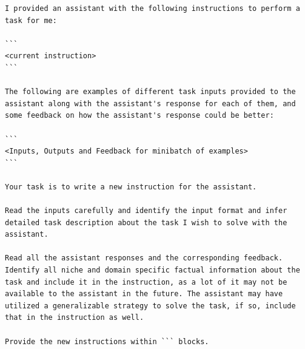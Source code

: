 \documentclass{article} %
\begin{document}
\begin{instructbox}

\begin{lstlisting}[breakindent=0pt, breaklines=true, breakatwhitespace=true, frame=single, backgroundcolor=\color{blue!10}]
I provided an assistant with the following instructions to perform a task for me:

```
<current instruction>
```

The following are examples of different task inputs provided to the assistant along with the assistant's response for each of them, and some feedback on how the assistant's response could be better:

```
<Inputs, Outputs and Feedback for minibatch of examples>
```

Your task is to write a new instruction for the assistant.

Read the inputs carefully and identify the input format and infer detailed task description about the task I wish to solve with the assistant.

Read all the assistant responses and the corresponding feedback. Identify all niche and domain specific factual information about the task and include it in the instruction, as a lot of it may not be available to the assistant in the future. The assistant may have utilized a generalizable strategy to solve the task, if so, include that in the instruction as well.

Provide the new instructions within ``` blocks.
\end{lstlisting}\label{fig:gepa_meta_prompt}
\end{instructbox}








\end{document}
